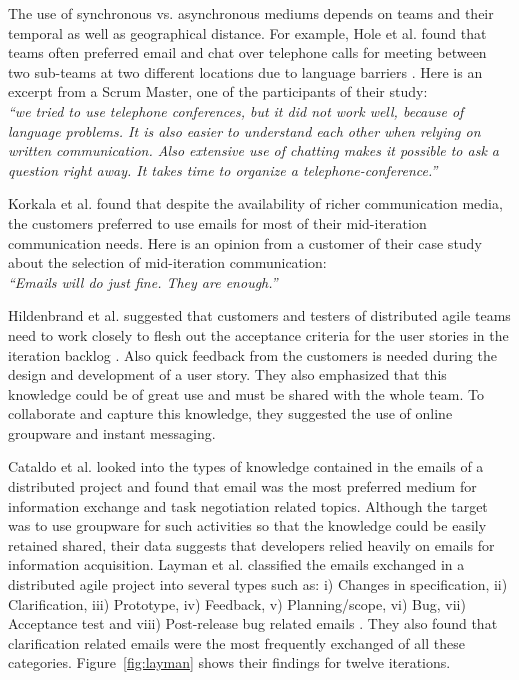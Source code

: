 The use of synchronous vs. asynchronous mediums depends on teams and their temporal as well as geographical distance. For example, Hole et al. found that teams often preferred email and chat over telephone calls for meeting between two sub-teams at two different locations due to language barriers \cite{a_case_study_of}. Here is an excerpt from a Scrum Master, one of the participants of their study:\\
\emph{``we tried to use telephone conferences, but it did not work well, because of language problems. It is also easier to understand each other when relying on written communication. Also extensive use of chatting makes it possible to ask a question right away. It takes time to organize a telephone-conference.''}

Korkala et al. found that despite the availability of richer communication media, the customers preferred to use emails for most of their mid-iteration communication needs\cite{communication_in_distributed}. Here is an opinion from a customer of their case study about the selection of mid-iteration communication:\\
\emph{``Emails will do just fine. They are enough.''}

Hildenbrand et al. suggested that customers and testers of distributed agile teams need to work closely to flesh out the acceptance criteria for the user stories in the iteration backlog \cite{agile_methods}. Also quick feedback from the customers is needed during the design and development of a user story. They also emphasized that this knowledge could be of great use and must be shared with the whole team. To collaborate and capture this knowledge, they suggested the use of online groupware and instant messaging.

Cataldo et al. looked into the types of knowledge contained in the emails of a distributed project and found that email was the most preferred medium for information exchange and task negotiation related topics\cite{on_coord}. Although the target was to use groupware for such activities so that the knowledge could be easily retained shared, their data suggests that developers relied heavily on emails for information acquisition. Layman et al. classified the emails exchanged in a distributed agile project into several types such as: i) Changes in specification, ii) Clarification, iii) Prototype, iv) Feedback, v) Planning/scope, vi) Bug, vii) Acceptance test and viii) Post-release bug related emails \cite{essential_communication}. They also found that clarification related emails were the most frequently exchanged of all these categories. Figure~\ref{fig:layman} shows their findings for twelve iterations.

